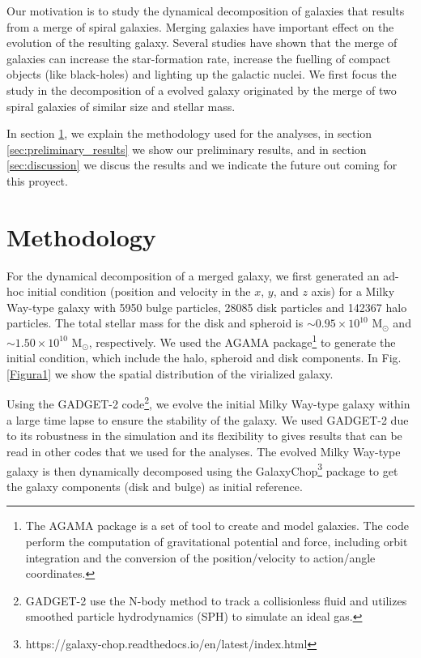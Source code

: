 \documentclass[baaa]{baaa}
\begin{document}
Our motivation is to study the dynamical decomposition of galaxies that results from a merge of spiral galaxies. Merging galaxies have important effect on the evolution of the resulting galaxy. Several studies \citep{Prieto_2021MNRAS_508_3672P,Gao_2020AA_637A_94G,Pearson_2019AA_631A_51P} have shown that the merge of galaxies can increase the star-formation rate, increase the fuelling of compact objects (like black-holes) and lighting up the galactic nuclei. We first focus the study in the decomposition of a evolved galaxy originated by the merge of two spiral galaxies of similar size and stellar mass.

In section \ref{sec:methodology}, we explain the methodology used for the analyses, in section \ref{sec:preliminary_results} we show our preliminary results, and in section \ref{sec:discussion} we discus the results and we indicate the future out coming for this proyect.

\section{Methodology}
\label{sec:methodology}

For the dynamical decomposition of a merged galaxy, we first generated an ad-hoc initial condition (position and velocity in the $x$, $y$, and $z$ axis) for a Milky Way-type galaxy with 5950 bulge particles, 28085 disk particles and 142367 halo particles. The total stellar mass for the disk and spheroid is $\sim 0.95\times10^{10}$ M$_{\odot}$ and $\sim 1.50\times10^{10}$ M$_{\odot}$, respectively. We used the AGAMA \citep{AGAMA} package\footnote{The AGAMA package is a set of tool to create and model galaxies. The code perform the computation of gravitational potential and force, including orbit integration and the conversion of the position/velocity to action/angle coordinates.} to generate the initial condition, which include the halo, spheroid and disk components. In Fig.\ref{Figura1} we show the spatial distribution of the virialized galaxy.

Using the GADGET-2\citep{GADGET-2} code\footnote{GADGET-2 use the N-body method to track a collisionless fluid and utilizes smoothed particle hydrodynamics (SPH) to simulate an ideal gas.}, we evolve the initial Milky Way-type galaxy within a large time lapse to ensure the stability of the galaxy. We used GADGET-2 due to its robustness in the simulation and its flexibility to gives results that can be read in other codes that we used for the analyses. The evolved Milky Way-type galaxy is then dynamically decomposed using the GalaxyChop\footnote{https://galaxy-chop.readthedocs.io/en/latest/index.html} package to get the galaxy components (disk and bulge) as initial reference.
\end{document}
